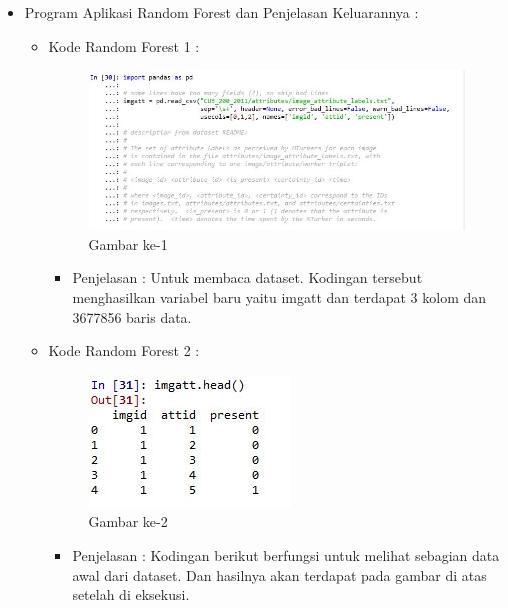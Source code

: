 \begin{enumerate}
\begin{itemize}
\begin{itemize}
\par
\par
\item Program Aplikasi Random Forest dan Penjelasan Keluarannya :
\begin{itemize}
\item Kode Random Forest 1 :
\par
\begin{figure}[ht]
\centering
\includegraphics[scale=0.7]{figures/hmm/cod1.jpg}
\caption{Gambar ke-1}
\label{contoh}
\end{figure}
\par
\begin{itemize}
\item Penjelasan : Untuk membaca dataset. Kodingan tersebut menghasilkan variabel baru yaitu imgatt dan terdapat 3 kolom dan 3677856 baris data.
\par 
\par
\end{itemize}
\item Kode Random Forest 2 :
\par
\begin{figure}[ht]
\centering
\includegraphics[scale=0.7]{figures/hmm/cod2.jpg}
\caption{Gambar ke-2}
\label{contoh}
\end{figure}
\par
\begin{itemize}
\item Penjelasan : Kodingan berikut berfungsi untuk melihat sebagian data awal dari dataset. Dan hasilnya akan terdapat pada gambar di atas setelah di eksekusi.
\par

\end{itemize}
\end{itemize}
\end{itemize}
\end{itemize}
\end{enumerate}
